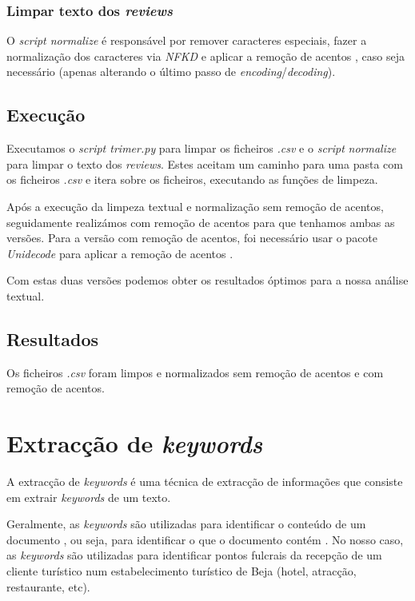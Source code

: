 \subsubsection{Limpar texto dos \textit{reviews}}

O \textit{script normalize} é responsável por remover caracteres especiais, fazer a normalização dos caracteres via \textit{NFKD} \cite{nfkd1} e aplicar a remoção de acentos \cite{cr1}, caso seja necessário (apenas alterando o último passo de \textit{encoding}/\textit{decoding}).

\subsection{Execução}

Executamos o \textit{script trimer.py} para limpar os ficheiros \textit{.csv} \cite{gfg1} e o \textit{script} \textit{normalize} para limpar o texto dos \textit{reviews}. Estes aceitam um caminho para uma pasta com os ficheiros \textit{.csv} e itera sobre os ficheiros, executando as funções de limpeza.

Após a execução da limpeza textual e normalização sem remoção de acentos, seguidamente realizámos com remoção de acentos para que tenhamos ambas as versões. Para a versão com remoção de acentos, foi necessário usar o pacote \textit{Unidecode} para aplicar a remoção de acentos \cite{cr1}.

Com estas duas versões podemos obter os resultados óptimos para a nossa análise textual.

\subsection{Resultados}

Os ficheiros \textit{.csv} foram limpos e normalizados sem remoção de acentos e com remoção de acentos.

\section{Extracção de \textit{keywords}}

A extracção de \textit{keywords} é uma técnica de extracção de informações que consiste em extrair \textit{keywords} de um texto.

Geralmente, as \textit{keywords} são utilizadas para identificar o conteúdo de um documento \cite{tamyt1}, ou seja, para identificar o que o documento contém \cite{tamyt2}. No nosso caso, as \textit{keywords} são utilizadas para identificar pontos fulcrais da recepção de um cliente turístico num estabelecimento turístico de Beja (hotel, atracção, restaurante, etc).

